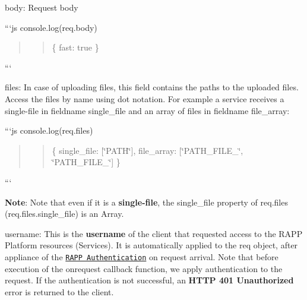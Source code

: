 \begin{DoxyItemize}
\item {\ttfamily body}\-: Request body
\end{DoxyItemize}

```js console.\-log(req.\-body) \begin{quotation}
\begin{quotation}
\{ fast\-: true \}

\end{quotation}


\end{quotation}
```


\begin{DoxyItemize}
\item {\ttfamily files}\-: In case of uploading files, this field contains the paths to the uploaded files. Access the files by name using dot notation. For example a service receives a single-\/file in fieldname {\ttfamily single\-\_\-file} and an array of files in fieldname {\ttfamily file\-\_\-array}\-:
\end{DoxyItemize}

```js console.\-log(req.\-files) \begin{quotation}
\begin{quotation}
\{ single\-\_\-file\-: \mbox{[}\char`\"{}\-P\-A\-T\-H\char`\"{}\mbox{]}, file\-\_\-array\-: \mbox{[}\char`\"{}\-P\-A\-T\-H\-\_\-\-F\-I\-L\-E\-\_\char`\"{}, \char`\"{}\-P\-A\-T\-H\-\_\-\-F\-I\-L\-E\-\_\char`\"{}\mbox{]} \}

\end{quotation}


\end{quotation}
```

{\bfseries Note}\-: Note that even if it is a {\bfseries single-\/file}, the {\ttfamily single\-\_\-file} property of {\ttfamily req.\-files} ({\ttfamily req.\-files.\-single\-\_\-file}) is an Array.


\begin{DoxyItemize}
\item {\ttfamily username}\-: This is the {\bfseries username} of the client that requested access to the R\-A\-P\-P Platform resources (Services). It is automatically applied to the {\ttfamily req} object, after appliance of the \href{https://github.com/rapp-project/rapp-platform/wiki/RAPP-Application-Authentication}{\tt R\-A\-P\-P Authentication} on request arrival. Note that before execution of the onrequest callback function, we apply authentication to the request. If the authentication is not successful, an {\bfseries H\-T\-T\-P 401 Unauthorized} error is returned to the client.
\end{DoxyItemize}

